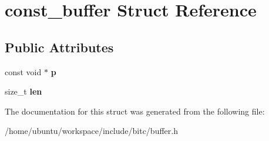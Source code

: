 \hypertarget{structconst__buffer}{\section{const\-\_\-buffer Struct Reference}
\label{structconst__buffer}
}
\subsection*{Public Attributes}
\begin{DoxyCompactItemize}
\item 
\hypertarget{structconst__buffer_a0f8f88d516b9e6a9088aa7927b780f01}{const void $\ast$ {\bfseries p}}\label{structconst__buffer_a0f8f88d516b9e6a9088aa7927b780f01}

\item 
\hypertarget{structconst__buffer_aeea2fa428f380d27375680cc0d7d9952}{size\-\_\-t {\bfseries len}}\label{structconst__buffer_aeea2fa428f380d27375680cc0d7d9952}

\end{DoxyCompactItemize}


The documentation for this struct was generated from the following file\-:\begin{DoxyCompactItemize}
\item 
/home/ubuntu/workspace/include/bitc/buffer.\-h\end{DoxyCompactItemize}
